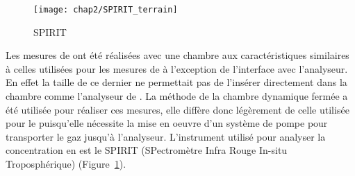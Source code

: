 \begin{figure}
\texttt{[image: chap2/SPIRIT\_terrain]}
\caption{SPIRIT}
\label{fig:SPIRIT}
\end{figure}

Les mesures de \chh ont été réalisées avec une chambre aux caractéristiques similaires à celles utilisées pour les mesures de \coo à l'exception de l'interface avec l'analyseur.
En effet la taille de ce dernier ne permettait pas de l'insérer directement dans la chambre comme l'analyseur de \coo.
La méthode de la chambre dynamique fermée a été utilisée pour réaliser ces mesures, elle diffère donc légèrement de celle utilisée pour le \coo puisqu'elle nécessite la mise en oeuvre d'un système de pompe pour transporter le gaz jusqu'à l'analyseur.
L'instrument utilisé pour analyser la concentration en \chh est le SPIRIT (SPectromètre Infra Rouge In-situ Troposphérique) (Figure~\ref{fig:SPIRIT}).

